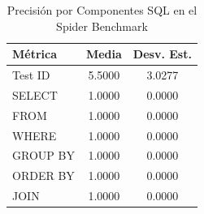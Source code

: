 \begin{table}[ht]
\centering
\caption{Precisión por Componentes SQL en el Spider Benchmark}
\label{tab:spider_components}
\begin{tabular}{lcc}
\toprule
\textbf{Métrica} & \textbf{Media} & \textbf{Desv. Est.} \\
\midrule
Test ID & 5.5000 & 3.0277 \\
SELECT & 1.0000 & 0.0000 \\
FROM & 1.0000 & 0.0000 \\
WHERE & 1.0000 & 0.0000 \\
GROUP BY & 1.0000 & 0.0000 \\
ORDER BY & 1.0000 & 0.0000 \\
JOIN & 1.0000 & 0.0000 \\
\bottomrule
\end{tabular}
\end{table}
